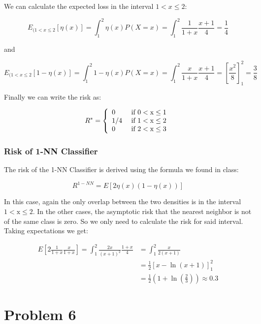 \documentclass[a4paper, 11pt]{article} %
\begin{document}
We can calculate the expected loss in the interval $1 < x \leq 2$:

$$E_{(1 < x \leq 2}[\eta(x)] = \int _ { 1 } ^ { 2 } \eta ( x ) P ( X = x ) = \int _ { 1 } ^ { 2 } \frac { 1 } { 1 + x } \frac { x + 1 } { 4 } = \frac { 1 } { 4 }$$

and 

$$E_{(1 < x \leq 2}[1-\eta(x)] = \int _ { 1 } ^ { 2 } 1-\eta ( x ) P ( X = x ) = \int _ { 1 } ^ { 2 } \frac { x } { 1 + x } \frac { x + 1 } { 4 } = \left[\frac{x^2}{8} \right]_1^2 = \frac { 3 } { 8 }$$

Finally we can write the risk as:

$$R ^ { * } = \left\{ \begin{array} { l l } { 0 } & { \text { if } 0 < \mathrm { x } \leq 1 } \\ { 1 / 4 } & { \text { if } 1 < \mathrm { x } \leq 2 } \\{ 0 } & { \text { if } 2 < \mathrm { x } \leq 3 } \end{array} \right.$$

\subsubsection*{Risk of 1-NN Classifier}

The risk of the 1-NN Classifier is derived using the formula we found in class: 

$$R ^ { 1 - N N } = E [ 2 \eta ( x ) ( 1 - \eta ( x ) ) ]$$ 

In this case, again the only overlap between the two densities is in the interval $1 < \mathrm { x } \leq 2$. In the other cases, the asymptotic risk that the nearest neighbor is not of the same class is zero. So we only need to calculate the risk for said interval. Taking expectations we get:

\begin{align*}
E \left[ 2 \frac { 1 } { 1 + x } \frac { x } { 1 + x } \right] = \int _ { 1 } ^ { 2 } \frac { 2 x } { ( x + 1 ) ^ { 2 } } \frac { 1 + x } { 4 } &= \int _ { 1 } ^ { 2 } \frac { x } { 2 ( x + 1 ) } \\
&=  \frac { 1 } { 2 } \left[ x - \ln ( x + 1 ) \right] _ { 1 } ^ { 2 }\\
&= \frac{1}{2} \left(1 + \ln \left(\frac{2}{3} \right) \right) \approx 0.3
\end{align*}


\section*{Problem 6} 
\end{document}
